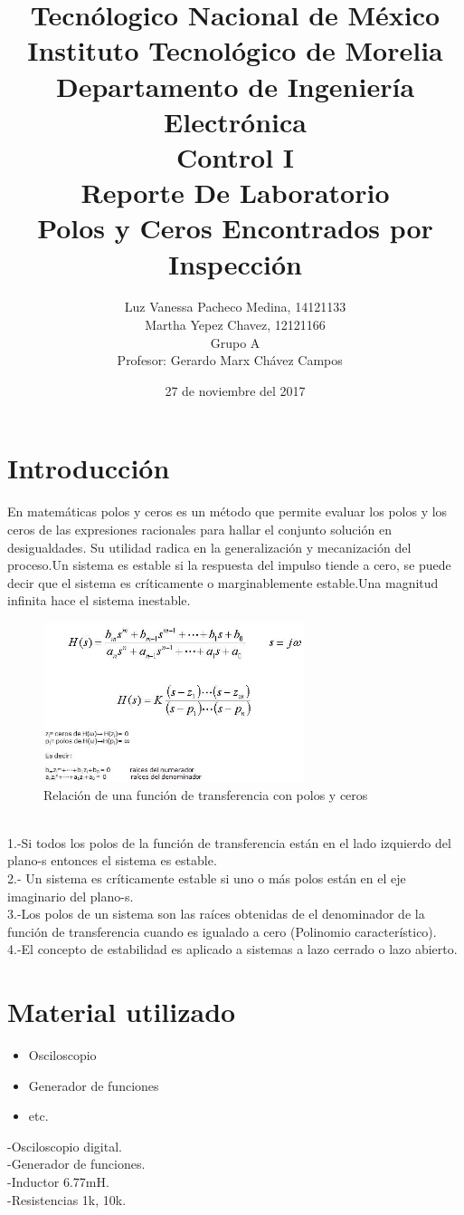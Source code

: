 \documentclass[12pt,letterpaper]{article}     %
\author{Luz Vanessa Pacheco Medina, 14121133 \\ Martha Yepez Chavez, 12121166 \\ {\small Grupo A}\\ Profesor: Gerardo Marx Chávez Campos  \vspace*{3.0in}}
\title{Tecnólogico Nacional de México\\Instituto Tecnológico de  Morelia\\{\small Departamento de Ingeniería Electrónica\\Control I\\\vspace*{0.55in} Reporte De Laboratorio}\\ Polos y Ceros Encontrados por Inspección \vspace*{1.35in}}
\date{27 de noviembre del 2017}
\begin{document}


\maketitle							%


\tableofcontents
\newpage
\listoffigures

\newpage
\section{Introducción}
En matemáticas polos y ceros es un método que permite evaluar los polos y los ceros  de las expresiones racionales  para hallar el conjunto solución en desigualdades. Su utilidad radica en la generalización y mecanización del proceso.Un sistema es estable si la respuesta del impulso tiende a cero, se puede decir que el sistema es críticamente o marginablemente estable.Una magnitud infinita hace el sistema inestable.
\begin{figure}[h!]
\centering
\includegraphics[width=3in]{Polos}
\caption{Relación de una función de transferencia con polos y ceros}
\end{figure}
\\
1.-Si todos los polos de la función de transferencia están  en el lado izquierdo del plano-s entonces el sistema es estable.
\\
2.- Un sistema es críticamente estable si uno o más polos están en el eje imaginario del plano-s.
\\
3.-Los polos de un sistema son las raíces obtenidas de el denominador de la función de transferencia cuando es igualado a cero (Polinomio característico).
\\
4.-El concepto de estabilidad es aplicado a sistemas a lazo cerrado o lazo abierto.

\section{Material utilizado} 
\begin{itemize}
	\item Osciloscopio
	\item Generador de funciones
	\item etc.
\end{itemize}
-Osciloscopio digital.\\
-Generador de funciones.\\
-Inductor  6.77mH.\\
-Resistencias 1k, 10k.
\end{document}
